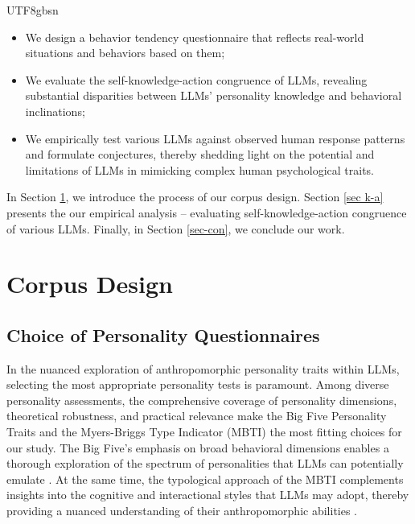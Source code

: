 \documentclass{article}
\theoremstyle{plain}
\theoremstyle{definition}
\theoremstyle{remark}
\begin{document}
\begin{CJK*}{UTF8}{gbsn}
\begin{itemize}
    \item We design a behavior tendency questionnaire that reflects real-world situations and behaviors based on them; 
    \item We evaluate the self-knowledge-action congruence of LLMs, revealing substantial disparities between LLMs' personality knowledge and behavioral inclinations;
    \item We empirically test various LLMs against observed human response patterns and formulate conjectures, thereby shedding light on the potential and limitations of LLMs in mimicking complex human psychological traits.
\end{itemize}


In Section \ref{sec-cd}, we introduce the process of our corpus design. Section \ref{sec k-a} presents the our empirical analysis – evaluating self-knowledge-action congruence of various LLMs. Finally, in Section \ref{sec-con}, we conclude our work. 

\section{Corpus Design}\label{sec-cd}

\iffalse
\subsection{Choice of Personality Questionnaires} \label{sec 2.1}
In the nuanced exploration of anthropomorphic personality traits within LLMs, selecting the most appropriate personality tests is paramount. Among diverse personality assessments, the comprehensive coverage of personality dimensions, theoretical robustness, and practical relevance make the Big Five Personality Traits \citep{goldberg1981language, costa2008revised} and the Myers-Briggs Type Indicator (MBTI) \citep{myers1962myers} the most fitting choices for our study. The Big Five's emphasis on broad behavioral dimensions enables a thorough exploration of the spectrum of personalities that LLMs can potentially emulate \citep{john1988lexical}. At the same time, the typological approach of the MBTI complements insights into the cognitive and interactional styles that LLMs may adopt, thereby providing a nuanced understanding of their anthropomorphic abilities \citep{myers1962myers}.


\end{CJK*}
\end{document}

